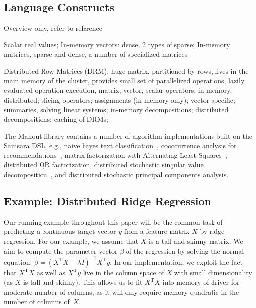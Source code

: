 \documentclass{article}
\begin{document}
\subsection{Language Constructs}\label{sec:language}

Overview only, refer to reference~\cite{Lyubimov2016}

Scalar real values; In-memory vectors: dense, 2 types of sparse; In-memory matrices, sparse and dense, a number of specialized matrices

Distributed Row Matrices (DRM): huge matrix, partitioned by rows, lives in the main memory of the cluster, provides small set of parallelized operations, lazily evaluated operation execution, matrix, vector, scalar operators: in-memory, distributed; slicing operators; assignments (in-memory only); vector-specific; summaries, solving linear systems; in-memory decompositions; distributed decompositions; caching of DRMs;

The Mahout library contains a number of algorithm implementations built on the Samsara DSL, e.g., naive bayes text classification~\cite{Rennie2003}, cooccurrence analysis for recommendations~\cite{Schelter2012,Dunning2014}, matrix factorization with Alternating Least Squares~\cite{Zhou2008}, distributed QR factorization, distributed stochastic singular value decomposition~\cite{Halko2012}, and distributed stochastic principal components analysis.

\subsection{Example: Distributed Ridge Regression}

Our running example throughout this paper will be the common task of predicting a continuous target vector $y$ from a feature matrix $X$ by ridge regression. For our example, we assume that $X$ is a tall and skinny matrix. We aim to compute the parameter vector $\beta$ of the regression by solving the normal equation: $\hat{\beta} = (X^\mathrm{T}X + \lambda I)^{-1} X^\mathrm{T}y$. In our implementation, we exploit the fact that $X^\mathrm{T} X$ as well as $X^\mathrm{T} y$ live in the column space of $X$ with small dimensionality (as $X$ is tall and skinny). This allows us to fit $X^\mathrm{T} X$ into memory of driver for moderate number of columns, as it will only require memory quadratic in the number of columns of~$X$.
\end{document}

